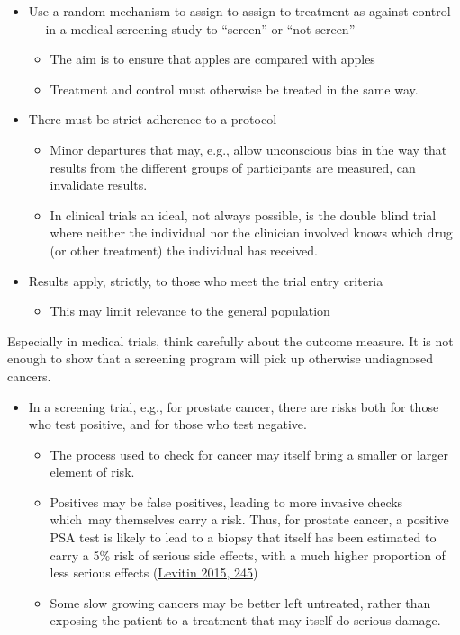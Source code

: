 \documentclass[
  10pt,
  b5paper]{book}
\providecommand{\tightlist}{%
  \setlength{\itemsep}{0pt}\setlength{\parskip}{0pt}}
\begin{document}
\begin{itemize}
\tightlist
\item
  Use a random mechanism to assign to assign to treatment as against
  control --- in a medical screening study to ``screen'' or ``not screen''

  \begin{itemize}
  \tightlist
  \item
    The aim is to ensure that apples are compared with apples
  \item
    Treatment and control must otherwise be treated in the same way.
  \end{itemize}
\item
  There must be strict adherence to a protocol

  \begin{itemize}
  \tightlist
  \item
    Minor departures that may, e.g., allow unconscious bias in the
    way that results from the different groups of participants are
    measured, can invalidate results.
  \item
    In clinical trials an ideal, not always possible, is the double
    blind trial where neither the individual nor the clinician
    involved knows which drug (or other treatment) the individual
    has received.
  \end{itemize}
\item
  Results apply, strictly, to those who meet the trial entry criteria

  \begin{itemize}
  \tightlist
  \item
    This may limit relevance to the general population
  \end{itemize}
\end{itemize}

Especially in medical trials, think carefully about the outcome measure.
It is not enough to show that a screening program will pick up otherwise
undiagnosed cancers.

\begin{itemize}
\tightlist
\item
  In a screening trial, e.g., for prostate cancer, there are risks
  both for those who test positive, and for those who test negative.

  \begin{itemize}
  \tightlist
  \item
    The process used to check for cancer may itself bring a smaller
    or larger element of risk.
  \item
    Positives may be false positives, leading to more invasive
    checks which~may themselves carry a risk. Thus, for prostate
    cancer, a positive PSA test is likely to lead to a biopsy that
    itself has been estimated to carry a 5\% risk of serious side
    effects, with a much higher proportion of less serious effects
    (\protect\hyperlink{ref-levitin_2015}{Levitin 2015, 245})
  \item
    Some slow growing cancers may be better left untreated, rather
    than exposing the patient to a treatment that may itself do
    serious damage.
  \end{itemize}
\end{itemize}
\end{document}
